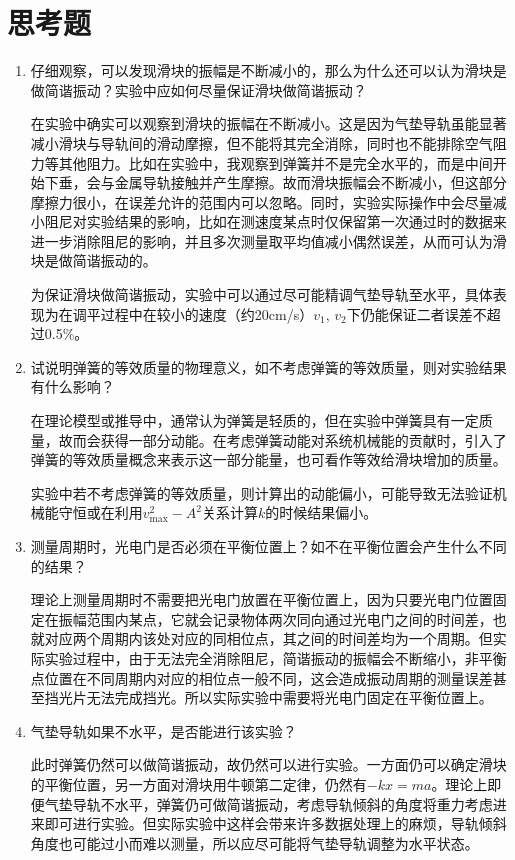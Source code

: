 \documentclass[12pt]{article}
\begin{document}
\section{思考题}
\begin{enumerate}
	\item {\kaishu 仔细观察，可以发现滑块的振幅是不断减小的，那么为什么还可以认为滑块是做简谐振动？实验中应如何尽量保证滑块做简谐振动？}
	
	在实验中确实可以观察到滑块的振幅在不断减小。这是因为气垫导轨虽能显著减小滑块与导轨间的滑动摩擦，但不能将其完全消除，同时也不能排除空气阻力等其他阻力。比如在实验中，我观察到弹簧并不是完全水平的，而是中间开始下垂，会与金属导轨接触并产生摩擦。故而滑块振幅会不断减小，但这部分摩擦力很小，在误差允许的范围内可以忽略。同时，实验实际操作中会尽量减小阻尼对实验结果的影响，比如在测速度某点时仅保留第一次通过时的数据来进一步消除阻尼的影响，并且多次测量取平均值减小偶然误差，从而可认为滑块是做简谐振动的。
	
	为保证滑块做简谐振动，实验中可以通过尽可能精调气垫导轨至水平，具体表现为在调平过程中在较小的速度（约20cm/s）$ v_1,\,v_2 $下仍能保证二者误差不超过0.5\%。
	
	\item {\kaishu 试说明弹簧的等效质量的物理意义，如不考虑弹簧的等效质量，则对实验结果有什么影响？}
	
	在理论模型或推导中，通常认为弹簧是轻质的，但在实验中弹簧具有一定质量，故而会获得一部分动能。在考虑弹簧动能对系统机械能的贡献时，引入了弹簧的等效质量概念来表示这一部分能量，也可看作等效给滑块增加的质量。

	实验中若不考虑弹簧的等效质量，则计算出的动能偏小，可能导致无法验证机械能守恒或在利用$ v_\max^2-A^2 $关系计算$ k $的时候结果偏小。
	
	\item {\kaishu 测量周期时，光电门是否必须在平衡位置上？如不在平衡位置会产生什么不同的结果？}
	
	理论上测量周期时不需要把光电门放置在平衡位置上，因为只要光电门位置固定在振幅范围内某点，它就会记录物体两次同向通过光电门之间的时间差，也就对应两个周期内该处对应的同相位点，其之间的时间差均为一个周期。但实际实验过程中，由于无法完全消除阻尼，简谐振动的振幅会不断缩小，非平衡点位置在不同周期内对应的相位点一般不同，这会造成振动周期的测量误差甚至挡光片无法完成挡光。所以实际实验中需要将光电门固定在平衡位置上。
	
	\item {\kaishu 气垫导轨如果不水平，是否能进行该实验？}
	
	此时弹簧仍然可以做简谐振动，故仍然可以进行实验。一方面仍可以确定滑块的平衡位置，另一方面对滑块用牛顿第二定律，仍然有$-kx=ma$。理论上即便气垫导轨不水平，弹簧仍可做简谐振动，考虑导轨倾斜的角度将重力考虑进来即可进行实验。但实际实验中这样会带来许多数据处理上的麻烦，导轨倾斜角度也可能过小而难以测量，所以应尽可能将气垫导轨调整为水平状态。


\end{enumerate}
\end{document}
